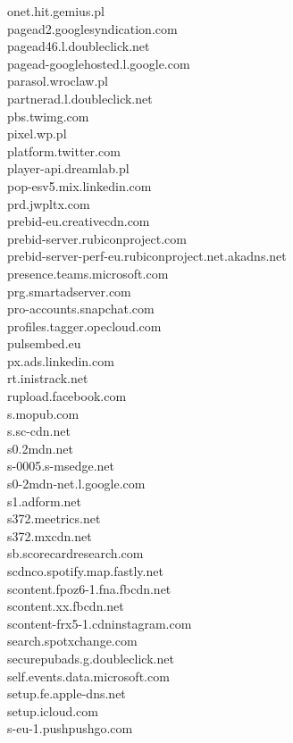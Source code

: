 \documentclass[12pt,a4paper]{article}
\begin{document}
\begin{scriptsize}
\begin{multicols}{3}
\begin{center}
                    onet.hit.gemius.pl\\pagead2.googlesyndication.com\\pagead46.l.doubleclick.net\\pagead-googlehosted.l.google.com\\parasol.wroclaw.pl\\
                    partnerad.l.doubleclick.net\\pbs.twimg.com\\pixel.wp.pl\\platform.twitter.com\\player-api.dreamlab.pl\\pop-esv5.mix.linkedin.com\\
                    prd.jwpltx.com\\prebid-eu.creativecdn.com\\prebid-server.rubiconproject.com\\prebid-server-perf-eu.rubiconproject.net.akadns.net\\
                    presence.teams.microsoft.com\\prg.smartadserver.com\\pro-accounts.snapchat.com\\profiles.tagger.opecloud.com\\pulsembed.eu\\
                    px.ads.linkedin.com\\rt.inistrack.net\\rupload.facebook.com\\s.mopub.com\\s.sc-cdn.net\\s0.2mdn.net\\s-0005.s-msedge.net\\
                    s0-2mdn-net.l.google.com\\s1.adform.net\\s372.meetrics.net\\s372.mxcdn.net\\sb.scorecardresearch.com\\scdnco.spotify.map.fastly.net\\
                    scontent.fpoz6-1.fna.fbcdn.net\\scontent.xx.fbcdn.net\\scontent-frx5-1.cdninstagram.com\\search.spotxchange.com\\
                    securepubads.g.doubleclick.net\\self.events.data.microsoft.com\\setup.fe.apple-dns.net\\setup.icloud.com\\s-eu-1.pushpushgo.com\\

\end{center}
\end{multicols}
\end{scriptsize}
\end{document}

